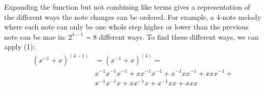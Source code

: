 \documentclass{article}
\begin{document}
Expanding the function but not combining like terms gives a representation of the different ways the note changes can be ordered. For example, a 4-note melody where each note can only be one whole step higher or lower than the previous note can be mae in: \(2^{4-1} = 8\)
different ways. To find these different ways, we can apply (1):
\begin{align*}
    (x^{-1} + x)^(4-1) & = (x^{-1} + x)^(3) = \\
    & x^{-1} x^{-1} x^{-1} + x x^{-1} x^{-1} + x^{-1} x x^{-1} + x x x^{-1} + \\
    & x^{-1} x^{-1} x + x x^{-1} x + x^{-1} x x + x x x
\end{align*}
\end{document}
